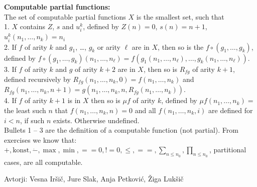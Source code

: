 \documentclass[a4paper,oneside,12pt]{article}
\theoremstyle{definition}
\begin{document}
\begin{minipage}[t][][t]{0.5\textwidth}
\textbf{Computable partial functions:}\\
The set of computable partial functions $X$ is the smallest set, such that\\
1. $X$ contains $Z$, $s$ and $u_i^k$, defined by $Z(n) = 0$, $s(n) = n+1$,
$u_i^k(n_1, \ldots, n_k) = n_i$\\
2. If $f$ of arity $k$ and $g_1$, \ldots, $g_k$ or arity $\ell$ are in $X$, then so is the
$f \circ (g_1, \ldots, g_k)$, defined by
$f \circ (g_1, \ldots, g_k)(n_1, \ldots, n_\ell) = f(g_1(n_1, \ldots, n_\ell), \ldots, g_k(n_1, \ldots, n_\ell))$. \\
3. If $f$ of arity $k$ and $g$ of arity $k+2$ are in $X$, then so is $R_{fg}$ of arity $k+1$, defined recursively by
$R_{fg}(n_1, \ldots, n_k, 0) = f(n_1, \ldots, n_k)$ and
$R_{fg}(n_1, \ldots, n_k, n+1) = g(n_1, \ldots, n_k, n, R_{fg}(n_1, \ldots, n_k))$. \\
4. If $f$ of arity $k+1$ is in $X$ then so is $\mu f$ of arity $k$, defined by
$\mu f(n_1, \ldots, n_k) = $ the least such $n$ that $f(n_1, \ldots, n_k, n) = 0$ and
all $f(n_1, \ldots, n_k, i)$ are defined for $i < n$, if such $n$ exists. Otherwise undefined.  \\
Bullets 1 -- 3 are the definition of a computable function (not partial).
From exercises we know that: $+, \text{konst}, \dot{-}, \max, \min, == 0, != 0, \leq, ==, \sum_{n \leq n_0}, \prod_{n \leq n_0}$, partitional cases, are all computable.
\end{minipage}
\hspace*{\fill} Avtorji: Vesna Iršič, Jure Slak, Anja Petković, Žiga Lukšič
\end{document}
